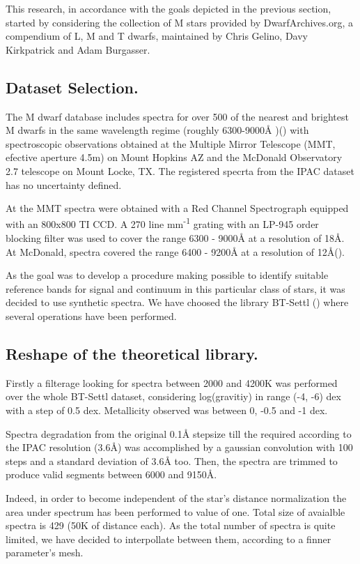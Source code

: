 {
This research, in accordance with the goals depicted in the previous section,
started by considering the collection of M stars provided by
DwarfArchives.org, a compendium of L, M and T dwarfs, 
maintained by Chris Gelino, Davy Kirkpatrick and Adam Burgasser.
}

\subsection{Dataset Selection.}
\label{subsec:DS}
{
The M dwarf database includes spectra for over 500 of the nearest and 
brightest M dwarfs in the same wavelength regime
(roughly 6300-9000{\AA} )(\cite{Kirkpatrick:2002eh}) with spectroscopic 
observations obtained at the Multiple Mirror Telescope (MMT, efective aperture 4.5m) 
on Mount Hopkins AZ and the McDonald Observatory 2.7 telescope on
Mount Locke, TX. The registered specrta from the IPAC dataset 
has no uncertainty defined.
}

{
At the MMT spectra were obtained with a Red Channel Spectrograph equipped 
with an 800x800 TI CCD. A 270 line mm\textsuperscript{-1} grating with an LP-945 order 
blocking filter was used to cover the range 6300 - 9000{\AA} at a resolution
of 18{\AA}. At McDonald, spectra covered the range 6400 - 9200{\AA} at a resolution 
of 12{\AA}(\cite{1994AJ....108.1437H}).
}

{
As the goal was to develop a procedure making possible to identify suitable 
reference bands for signal and continuum in this particular class of stars, 
it was decided to use synthetic spectra. We have choosed the library BT-Settl
(\cite{2013MSAIS..24..128A}) where several operations have been performed.
}

\subsection {Reshape of the theoretical library.}
\label{subsec:RTL}
{
Firstly a filterage looking for spectra between 2000 and 4200K was performed over 
the whole BT-Settl dataset, considering log(gravitiy) in range (-4, -6) dex 
with a step of 0.5 dex. Metallicity observed was between 0, -0.5 and -1 dex.

Spectra degradation from the original 0.1{\AA} stepsize till the required
according to the IPAC resolution (3.6{\AA}) was accomplished by a gaussian convolution
with 100 steps and a standard deviation of 3.6{\AA} too.
Then, the spectra are trimmed to produce valid segments between 6000 and 9150{\AA}.
}
{
Indeed, in order to become independent of the star\textquoteright s distance 
normalization the area under spectrum has been performed to value of one.
}
{
Total size of avaialble spectra is 429 (50K of distance each). 
As the total number of spectra is quite limited, we have decided to
interpollate between them, according to a finner parameter\textquoteright s mesh.
}

